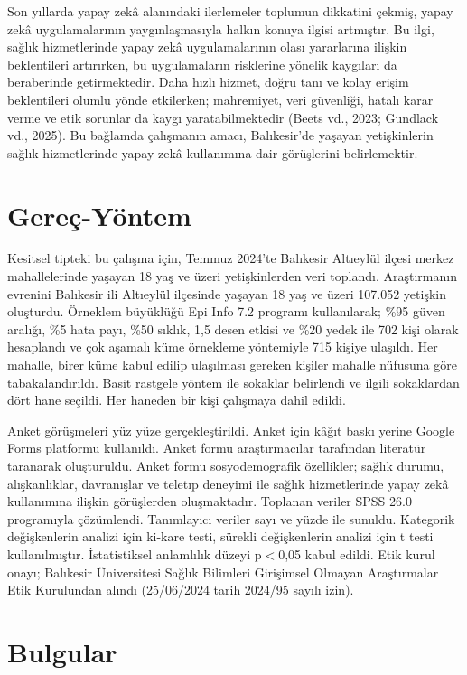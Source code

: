 Son yıllarda yapay zekâ alanındaki ilerlemeler toplumun dikkatini çekmiş,
yapay zekâ uygulamalarının yaygınlaşmasıyla halkın konuya ilgisi artmıştır. Bu
ilgi, sağlık hizmetlerinde yapay zekâ uygulamalarının olası yararlarına ilişkin
beklentileri artırırken, bu uygulamaların risklerine yönelik kaygıları da
beraberinde getirmektedir. Daha hızlı hizmet, doğru tanı ve kolay erişim
beklentileri olumlu yönde etkilerken; mahremiyet, veri güvenliği, hatalı karar
verme ve etik sorunlar da kaygı yaratabilmektedir (Beets vd., 2023; Gundlack
vd., 2025). Bu bağlamda çalışmanın amacı, Balıkesir'de yaşayan yetişkinlerin
sağlık hizmetlerinde yapay zekâ kullanımına dair görüşlerini belirlemektir.

\section{Gereç-Yöntem}

Kesitsel tipteki bu çalışma için, Temmuz 2024'te Balıkesir Altıeylül ilçesi
merkez mahallelerinde yaşayan 18 yaş ve üzeri yetişkinlerden veri toplandı.
Araştırmanın evrenini Balıkesir ili Altıeylül ilçesinde yaşayan 18 yaş ve üzeri
107.052 yetişkin oluşturdu. Örneklem büyüklüğü Epi Info 7.2 programı
kullanılarak; \%95 güven aralığı, \%5 hata payı, \%50 sıklık, 1,5 desen etkisi
ve \%20 yedek ile 702 kişi olarak hesaplandı ve çok aşamalı küme örnekleme
yöntemiyle 715 kişiye ulaşıldı. Her mahalle, birer küme kabul edilip
ulaşılması gereken kişiler mahalle nüfusuna göre tabakalandırıldı. Basit
rastgele yöntem ile sokaklar belirlendi ve ilgili sokaklardan dört hane
seçildi. Her haneden bir kişi çalışmaya dahil edildi.

Anket görüşmeleri yüz yüze gerçekleştirildi. Anket için kâğıt baskı yerine
Google Forms platformu kullanıldı. Anket formu araştırmacılar tarafından
literatür taranarak oluşturuldu. Anket formu sosyodemografik özellikler; sağlık
durumu, alışkanlıklar, davranışlar ve teletıp deneyimi ile sağlık
hizmetlerinde yapay zekâ kullanımına ilişkin görüşlerden oluşmaktadır.
Toplanan veriler SPSS 26.0 programıyla çözümlendi. Tanımlayıcı veriler sayı ve
yüzde ile sunuldu. Kategorik değişkenlerin analizi için ki-kare testi, sürekli
değişkenlerin analizi için t testi kullanılmıştır. İstatistiksel anlamlılık
düzeyi p${<}$0,05 kabul edildi. Etik kurul onayı; Balıkesir Üniversitesi
Sağlık Bilimleri Girişimsel Olmayan Araştırmalar Etik Kurulundan alındı
(25/06/2024 tarih 2024/95 sayılı izin).

\section{Bulgular}

